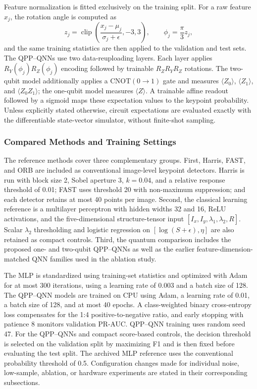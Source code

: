 \documentclass[11pt]{article}
\begin{document}
Feature normalization is fitted exclusively on the training split. For a raw
feature $x_j$, the rotation angle is computed as
\begin{equation}
    z_j=\operatorname{clip}\!\left(
        \frac{x_j-\mu_j}{\sigma_j+\epsilon},-3,3
    \right),
    \qquad
    \phi_j=\frac{\pi}{3}z_j,
\end{equation}
and the same training statistics are then applied to the validation and test
sets. The QPP--QNNs use two data-reuploading layers. Each layer applies
$R_Y(\phi_j)R_Z(\phi_j)$ encoding followed by trainable
$R_ZR_YR_Z$ rotations. The two-qubit model additionally applies a
$\mathrm{CNOT}(0\!\rightarrow\!1)$ gate and measures
$\langle Z_0\rangle$, $\langle Z_1\rangle$, and
$\langle Z_0Z_1\rangle$; the one-qubit model measures $\langle Z\rangle$.
A trainable affine readout followed by a sigmoid maps these expectation values
to the keypoint probability. Unless explicitly stated otherwise, circuit
expectations are evaluated exactly with the differentiable state-vector
simulator, without finite-shot sampling.

\subsubsection{Compared Methods and Training Settings}

The reference methods cover three complementary groups. First, Harris, FAST,
and ORB are included as conventional image-level keypoint detectors. Harris is
run with block size 2, Sobel aperture 3, $k=0.04$, and a relative response
threshold of 0.01; FAST uses threshold 20 with non-maximum suppression; and
each detector retains at most 40 points per image. Second, the classical
learning reference is a multilayer perceptron with hidden widths 32 and 16,
ReLU activations, and the five-dimensional structure-tensor input
$[I_x,I_y,\lambda_1,\lambda_2,R]$. Scalar $\lambda_2$ thresholding and logistic
regression on $[\log(S+\epsilon),\eta]$ are also retained as compact controls.
Third, the quantum comparison includes the proposed one- and two-qubit
QPP--QNNs as well as the earlier feature-dimension-matched QNN families used in
the ablation study.

The MLP is standardized using training-set statistics and optimized with Adam
for at most 300 iterations, using a learning rate of 0.003 and a batch size of
128. The QPP--QNN models are trained on CPU using Adam, a learning rate of 0.01,
a batch size of 128, and at most 40 epochs. A class-weighted binary
cross-entropy loss compensates for the 1:4 positive-to-negative ratio, and
early stopping with patience 8 monitors validation PR-AUC. QPP--QNN training
uses random seed 47. For the QPP--QNNs and compact score-based controls, the
decision threshold is selected on the validation split by maximizing F1 and is
then fixed before evaluating the test split. The archived MLP reference uses
the conventional probability threshold of 0.5. Configuration changes made for
individual noise, low-sample, ablation, or hardware experiments are stated in
their corresponding subsections.
\end{document}
